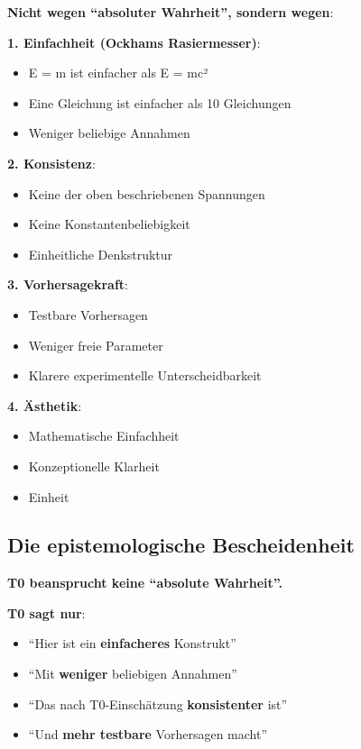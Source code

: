	\textbf{Nicht wegen ``absoluter Wahrheit'', sondern wegen}:
	
	\textbf{1. Einfachheit (Ockhams Rasiermesser)}:
	\begin{itemize}
		\item E = m ist einfacher als E = mc²
		\item Eine Gleichung ist einfacher als 10 Gleichungen
		\item Weniger beliebige Annahmen
	\end{itemize}
	
	\textbf{2. Konsistenz}:
	\begin{itemize}
		\item Keine der oben beschriebenen Spannungen
		\item Keine Konstantenbeliebigkeit
		\item Einheitliche Denkstruktur
	\end{itemize}
	
	\textbf{3. Vorhersagekraft}:
	\begin{itemize}
		\item Testbare Vorhersagen
		\item Weniger freie Parameter
		\item Klarere experimentelle Unterscheidbarkeit
	\end{itemize}
	
	\textbf{4. Ästhetik}:
	\begin{itemize}
		\item Mathematische Einfachheit
		\item Konzeptionelle Klarheit
		\item Einheit
	\end{itemize}
	
	\subsection{Die epistemologische Bescheidenheit}
	
	\textbf{T0 beansprucht keine ``absolute Wahrheit''.}
	
	\textbf{T0 sagt nur}:
	\begin{itemize}
		\item ``Hier ist ein \textbf{einfacheres} Konstrukt''
		\item ``Mit \textbf{weniger} beliebigen Annahmen''
		\item ``Das nach T0-Einschätzung \textbf{konsistenter} ist''
		\item ``Und \textbf{mehr testbare} Vorhersagen macht''
	\end{itemize}
	
